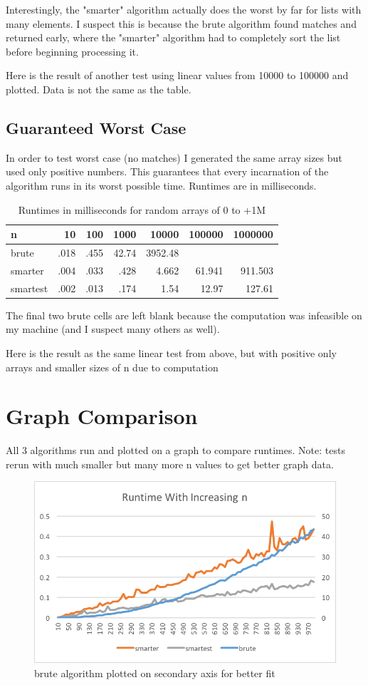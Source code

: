 \documentclass[11pt]{article}
\begin{document}
Interestingly, the "smarter" algorithm actually does the worst by far
for lists with many elements. I suspect this is because the brute
algorithm found matches and returned early, where the "smarter"
algorithm had to completely sort the list before beginning processing
it.

Here is the result of another test using linear values from 10000 to
100000 and plotted. Data is not the same as the table.

\subsection{Guaranteed Worst Case}
\label{sec-2-2}

In order to test worst case (no matches) I generated the same array
sizes but used only positive numbers. This guarantees that every
incarnation of the algorithm runs in its worst possible time. Runtimes
are in milliseconds.

\begin{table}[htb]
\caption{Runtimes in milliseconds for random arrays of 0 to +1M}
\centering
\begin{tabular}{lrrrrrr}
n & 10 & 100 & 1000 & 10000 & 100000 & 1000000\\
\hline
brute & .018 & .455 & 42.74 & 3952.48 &  & \\
smarter & .004 & .033 & .428 & 4.662 & 61.941 & 911.503\\
smartest & .002 & .013 & .174 & 1.54 & 12.97 & 127.61\\
\end{tabular}
\end{table}

The final two brute cells are left blank because the computation was
infeasible on my machine (and I suspect many others as well).

Here is the result as the same linear test from above, but with
positive only arrays and smaller sizes of n due to computation

\section{Graph Comparison}
\label{sec-3}

All 3 algorithms run and plotted on a graph to compare runtimes. Note:
tests rerun with much smaller but many more n values to get better
graph data.

\begin{figure}[htb]
\centering
\includegraphics[width=.9\linewidth]{./hw1_graph.png}
\caption{\label{hw1_graph.png}brute algorithm plotted on secondary axis for better fit}
\end{figure}
\end{document}
